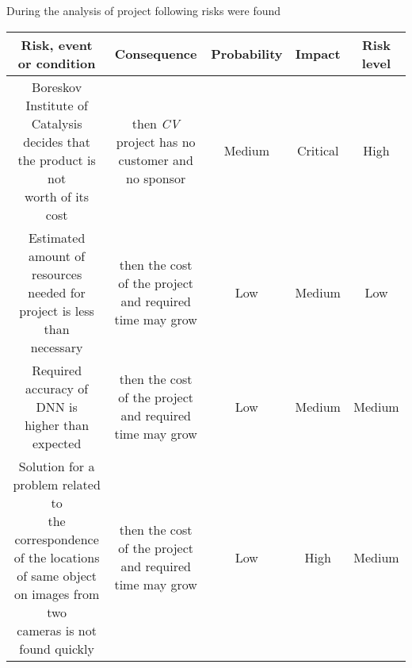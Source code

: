 During the analysis of project following risks were found
\\

\begin{tabular}{ | c | c | c | c | c | }
	\hline
	\textbf{Risk, event or condition} & \textbf{Consequence} & \textbf{Probability} &  \textbf{Impact} &  \textbf{Risk level} \\ \hline
	\specialcell{Boreskov Institute of Catalysis\\decides that the product is not \\worth of its cost} & \specialcell{then \textit{CV} project has no\\customer and no sponsor} & Medium & Critical & High \\ \hline
	\specialcell{Estimated amount of resources\\needed for project is less than\\necessary} & \specialcell{then the cost of the project\\and required time may grow} & Low & Medium & Low \\ \hline
	\specialcell{Required accuracy of DNN is\\higher than expected} & \specialcell{then the cost of the project\\and required time may grow} & Low & Medium & Medium \\ \hline
	\specialcell{Solution for a problem related to\\the correspondence of the locations\\of same object on images from two\\cameras is not found quickly} & \specialcell{then the cost of the project\\and required time may grow} & Low & High & Medium \\ \hline
\end{tabular}

